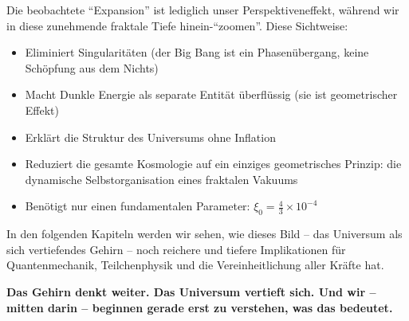 Die beobachtete \enquote{Expansion} ist lediglich unser Perspektiveneffekt, während wir in diese zunehmende fraktale Tiefe hinein-\enquote{zoomen}. Diese Sichtweise:

\begin{itemize}[leftmargin=*]
\item Eliminiert Singularitäten (der Big Bang ist ein Phasenübergang, keine Schöpfung aus dem Nichts)
\item Macht Dunkle Energie als separate Entität überflüssig (sie ist geometrischer Effekt)
\item Erklärt die Struktur des Universums ohne Inflation
\item Reduziert die gesamte Kosmologie auf ein einziges geometrisches Prinzip: die dynamische Selbstorganisation eines fraktalen Vakuums
\item Benötigt nur einen fundamentalen Parameter: $\xi_0 = \frac{4}{3} \times 10^{-4}$
\end{itemize}

In den folgenden Kapiteln werden wir sehen, wie dieses Bild -- das Universum als sich vertiefendes Gehirn -- noch reichere und tiefere Implikationen für Quantenmechanik, Teilchenphysik und die Vereinheitlichung aller Kräfte hat.

\textbf{Das Gehirn denkt weiter. Das Universum vertieft sich. Und wir -- mitten darin -- beginnen gerade erst zu verstehen, was das bedeutet.}



